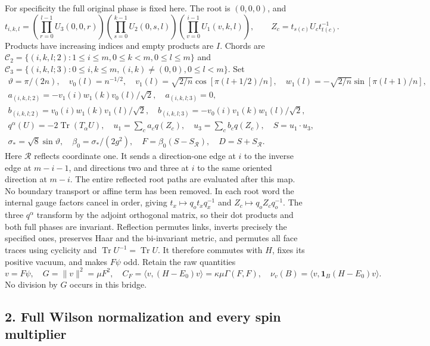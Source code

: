 \documentclass[11pt]{article}
\begin{document}
For specificity the full original phase is fixed here. The root is \((0,0,0)\), and
\[
 t_{i,k,l}=
 \left(\prod_{r=0}^{l-1}U_3(0,0,r)\right)
 \left(\prod_{s=0}^{k-1}U_2(0,s,l)\right)
 \left(\prod_{v=0}^{i-1}U_1(v,k,l)\right),
 \qquad Z_c=t_{s(c)}U_ct_{t(c)}^{-1}.
 \tag{AT4}
\]
Products have increasing indices and empty products are \(I\). Chords are
\(\mathcal C_2=\{(i,k,l;2):1\le i\le m,0\le k<m,0\le l\le m\}\) and
\(\mathcal C_3=\{(i,k,l;3):0\le i,k\le m,(i,k)\ne(0,0),0\le l<m\}\).
Set
\[
 \begin{gathered}
 \vartheta=\pi/(2n),\quad v_0(l)=n^{-1/2},\quad
 v_1(l)=\sqrt{2/n}\cos[\pi(l+1/2)/n],\quad
 w_1(l)=-\sqrt{2/n}\sin[\pi(l+1)/n],\\
 a_{(i,k,l;2)}=-v_1(i)w_1(k)v_0(l)/\sqrt2,\quad a_{(i,k,l;3)}=0,\\
 b_{(i,k,l;2)}=v_0(i)w_1(k)v_1(l)/\sqrt2,\quad
 b_{(i,k,l;3)}=-v_0(i)v_1(k)w_1(l)/\sqrt2,\\
 q^\alpha(U)=-2\operatorname{Tr}(T_\alpha U),\quad
 u_1=\sum_ca_cq(Z_c),\quad u_3=\sum_cb_cq(Z_c),\quad S=u_1\cdot u_3,\\
 \sigma_*=\sqrt8\sin\vartheta,\quad\beta_0=\sigma_*/(2g^2),\quad
 F=\beta_0(S-S_{\mathcal R}),\quad D=S+S_{\mathcal R}.
 \end{gathered}\tag{AT5}
\]
Here \(\mathcal R\) reflects coordinate one. It sends a direction-one edge at \(i\) to the inverse edge at \(m-i-1\), and directions two and three at \(i\) to the same oriented direction at \(m-i\). The entire reflected root paths are evaluated after this map. No boundary transport or affine term has been removed. In each root word the internal gauge factors cancel in order, giving \(t_x\mapsto q_ot_xq_x^{-1}\) and \(Z_c\mapsto q_oZ_cq_o^{-1}\). The three \(q^\alpha\) transform by the adjoint orthogonal matrix, so their dot products and both full phases are invariant. Reflection permutes links, inverts precisely the specified ones, preserves Haar and the bi-invariant metric, and permutes all face traces using cyclicity and \(\operatorname{Tr}U^{-1}=\operatorname{Tr}U\). It therefore commutes with \(H\), fixes its positive vacuum, and makes \(F\psi\) odd. Retain the raw quantities
\[
 v=F\psi,\quad G=\|v\|^2=\mu F^2,\quad
 C_F=\langle v,(H-E_0)v\rangle=\kappa\mu\Gamma(F,F),\quad
 \nu_v(B)=\langle v,\mathbf1_B(H-E_0)v\rangle .
 \tag{AT6}
\]
No division by \(G\) occurs in this bridge.

\subsection*{2. Full Wilson normalization and every spin multiplier}
\end{document}
